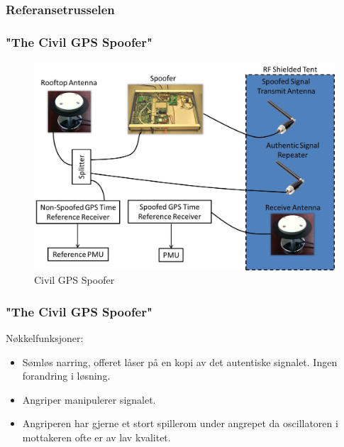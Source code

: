 \documentclass[xcolor=table]{beamer}
\begin{document}
\subsubsection{Referansetrusselen}
\begin{frame}
  \frametitle{"The Civil GPS Spoofer"}
  \begin{figure}
    \includegraphics[scale=0.2]{thesis/graphics/spoof.jpg}
    \caption{Civil GPS Spoofer \cite{EVPMUGA}}
  \end{figure}
\end{frame}

\begin{frame}
  \frametitle{"The Civil GPS Spoofer"}
  Nøkkelfunksjoner:
  \begin{itemize}
    \item Sømløs narring, offeret låser på en kopi av det autentiske signalet. Ingen forandring i løsning.
    \item Angriper manipulerer signalet.
    \item Angriperen har gjerne et stort spillerom under angrepet da oscillatoren i mottakeren ofte er av lav kvalitet.
  \end{itemize}
\end{frame}
\end{document}

